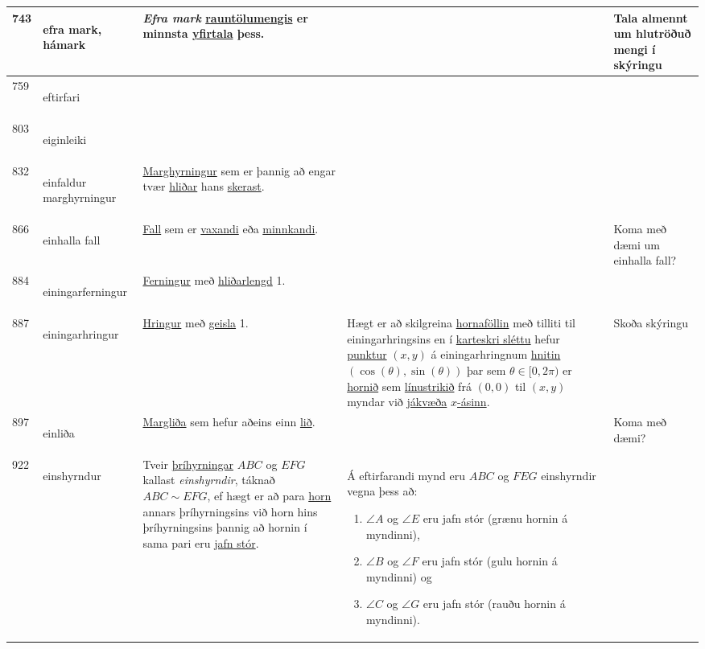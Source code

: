 \begin{longtable}{p{} | p{} | p{} | p{} | p{}}
\hline
743 & \hypertarget{row:743}{efra mark, hámark} & \textit{Efra mark} \hyperlink{row:4093}{rauntölu}\hyperlink{row:3270}{mengis} er minnsta \hyperlink{row:6280}{yfirtala} þess. &  & Tala almennt um hlutröðuð mengi í skýringu \\
\hline
759 & \hypertarget{row:759}{eftirfari} &  &  &  \\
\hline
803 & \hypertarget{row:803}{eiginleiki} &  &  &  \\
\hline
832 & \hypertarget{row:832}{einfaldur marghyrningur} & \hyperlink{row:3161}{Marghyrningur} sem er þannig að engar tvær \hyperlink{row:2048}{hliðar} hans \hyperlink{row:4771}{skerast}. &  &  \\
\hline
866 & \hypertarget{row:866}{einhalla fall} & \hyperlink{row:1078}{Fall} sem er \hyperlink{row:0}{vaxandi} eða \hyperlink{row:0}{minnkandi}. &  & Koma með dæmi um einhalla fall? \\
\hline
884 & \hypertarget{row:884}{einingarferningur} & \hyperlink{row:1163}{Ferningur} með \hyperlink{row:0}{hliðarlengd} 1. &  &  \\
\hline
887 & \hypertarget{row:887}{einingarhringur} & \hyperlink{row:2295}{Hringur} með \hyperlink{row:1619}{geisla} 1. & Hægt er að skilgreina \hyperlink{row:2202}{hornaföllin} með tilliti til einingarhringsins en í \hyperlink{row:6595}{karteskri sléttu} hefur \hyperlink{row:4001}{punktur} \((x,y)\) á einingarhringnum \hyperlink{row:2143}{hnitin} \((\cos(\theta),\sin(\theta))\) þar sem \(\theta\in[0,2\pi)\) er \hyperlink{row:2198}{hornið} sem \hyperlink{row:2958}{línustrikið} frá \((0,0)\) til \((x,y)\) myndar við \hyperlink{row:2535}{jákvæða} \hyperlink{row:6252}{\(x\)-ásinn}. & Skoða skýringu \\
\hline
897 & \hypertarget{row:897}{einliða} & \hyperlink{row:1948}{Margliða} sem hefur aðeins einn \hyperlink{row:4425}{lið}. &  & Koma með dæmi? \\
\hline
922 & \hypertarget{row:922}{einshyrndur} & Tveir \hyperlink{row:6438}{þríhyrningar} \(ABC\) og \(EFG\) kallast \textit{einshyrndir}, táknað \(ABC \sim EFG\), ef hægt er að para \hyperlink{row:2198}{horn} annars þríhyrningsins við horn hins þríhyrningsins þannig að hornin í sama pari eru \hyperlink{row:2223}{jafn stór}. & Á eftirfarandi mynd eru \(ABC\) og \(FEG\) einshyrndir vegna þess að:

\begin{enumerate}
    \item \(\angle A\) og \(\angle E\) eru jafn stór (grænu hornin á myndinni),
    \item \(\angle B\) og \(\angle F\) eru jafn stór (gulu hornin á myndinni) og
    \item \(\angle C\) og \(\angle G\) eru jafn stór (rauðu hornin á myndinni).
\end{enumerate}


\end{longtable}
